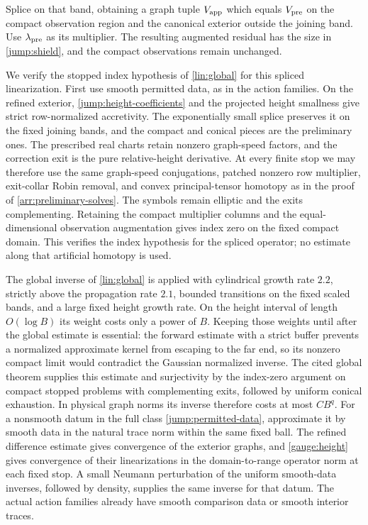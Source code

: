 Splice on that band, obtaining a graph tuple $V_{\rm app}$ which
equals $V_{\rm pre}$ on the compact observation region and the
canonical exterior outside the joining band.  Use
$\lambda_{\rm pre}$ as its multiplier.  The resulting augmented
residual has the size in \eqref{jump:shield}, and the compact
observations remain unchanged.

We verify the stopped index hypothesis of \cref{lin:global} for
this spliced linearization.  First use smooth permitted data, as
in the action families.  On the refined exterior,
\eqref{jump:height-coefficients} and the projected height
smallness give strict row-normalized accretivity.  The
exponentially small splice preserves it on the fixed joining
bands, and the compact and conical pieces are the preliminary
ones.  The prescribed real charts retain nonzero graph-speed
factors, and the correction exit is the pure relative-height
derivative.  At every finite stop we may therefore use the
same graph-speed conjugations, patched nonzero row multiplier,
exit-collar Robin removal, and convex principal-tensor homotopy
as in the proof of \cref{arr:preliminary-solves}.  The symbols
remain elliptic and the exits complementing.  Retaining the
compact multiplier columns and the equal-dimensional
observation augmentation gives index zero on the fixed
compact domain.  This verifies the index hypothesis for the
spliced operator; no estimate along that artificial homotopy
is used.

The global inverse of \cref{lin:global} is applied with cylindrical
growth rate $2.2$, strictly above the propagation rate $2.1$, bounded transitions on the fixed
scaled bands, and a large fixed height growth rate.  On the height
interval of length $O(\log B)$ its weight costs only a power of $B$.
Keeping those weights until after the global estimate is essential:
the forward estimate with a strict buffer prevents a normalized
approximate kernel from escaping to the far end, so its nonzero
compact limit would contradict the Gaussian normalized inverse.
The cited global theorem supplies this estimate and surjectivity by
the index-zero argument on compact stopped problems with complementing
exits, followed by uniform conical exhaustion.  In physical graph norms
its inverse therefore costs at most $CB^q$.
For a nonsmooth datum in the full class
\eqref{jump:permitted-data}, approximate it by smooth data in
the natural trace norm within the same fixed ball.  The
refined difference estimate gives convergence of the exterior
graphs, and \cref{gauge:height} gives convergence of their
linearizations in the domain-to-range operator norm at each
fixed stop.  A small Neumann perturbation of the uniform
smooth-data inverses, followed by density, supplies the same
inverse for that datum.  The actual action families already
have smooth comparison data or smooth interior traces.

